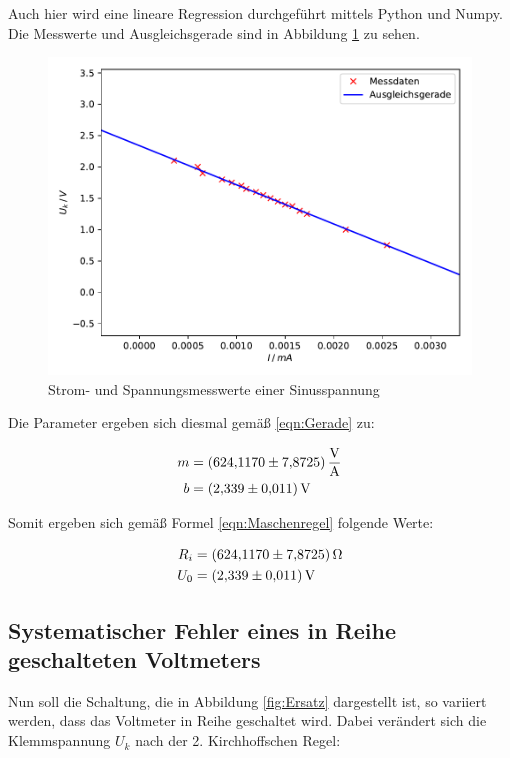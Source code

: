 Auch hier wird eine lineare Regression durchgeführt mittels Python 
und Numpy. Die Messwerte und Ausgleichsgerade sind in Abbildung \ref{fig:plot4}
zu sehen.

\begin{figure}
  \centering
  \includegraphics[scale=0.75]{content/plot4.pdf}
  \caption{Strom- und Spannungsmesswerte einer Sinusspannung}
  \label{fig:plot4}
\end{figure}

Die Parameter ergeben sich diesmal gemäß \ref{eqn:Gerade} zu: 

\begin{align*}
m &= \SI{624.117+-7.8725}{\volt\per\ampere}\\
b &= \SI{2.339+-0.011}{\volt}
\end{align*}

Somit ergeben sich gemäß Formel \ref{eqn:Maschenregel} folgende Werte:

\begin{align*}
R_i &= \SI{624.117+-7.8725}{\ohm}\\
U_0 &= \SI{2.339+-0.011}{\volt}
\end{align*}

\subsection{Systematischer Fehler eines in Reihe geschalteten Voltmeters}

Nun soll die Schaltung, die in Abbildung \ref{fig:Ersatz} dargestellt ist, 
so variiert werden, dass das Voltmeter in Reihe geschaltet wird.
Dabei verändert sich die Klemmspannung $U_k$ nach der 2. Kirchhoffschen Regel:

